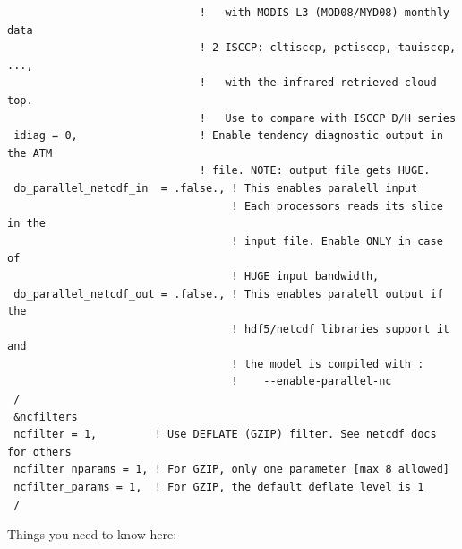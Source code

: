 {\begin{Verbatim}
                              !   with MODIS L3 (MOD08/MYD08) monthly data
                              ! 2 ISCCP: cltisccp, pctisccp, tauisccp, ...,
                              !   with the infrared retrieved cloud top.
                              !   Use to compare with ISCCP D/H series
 idiag = 0,                   ! Enable tendency diagnostic output in the ATM
                              ! file. NOTE: output file gets HUGE.
 do_parallel_netcdf_in  = .false., ! This enables paralell input
                                   ! Each processors reads its slice in the
                                   ! input file. Enable ONLY in case of
                                   ! HUGE input bandwidth,
 do_parallel_netcdf_out = .false., ! This enables paralell output if the 
                                   ! hdf5/netcdf libraries support it and
                                   ! the model is compiled with :
                                   !    --enable-parallel-nc
 /
 &ncfilters
 ncfilter = 1,         ! Use DEFLATE (GZIP) filter. See netcdf docs for others
 ncfilter_nparams = 1, ! For GZIP, only one parameter [max 8 allowed]
 ncfilter_params = 1,  ! For GZIP, the default deflate level is 1
 /
\end{Verbatim}
}

Things you need to know here:

